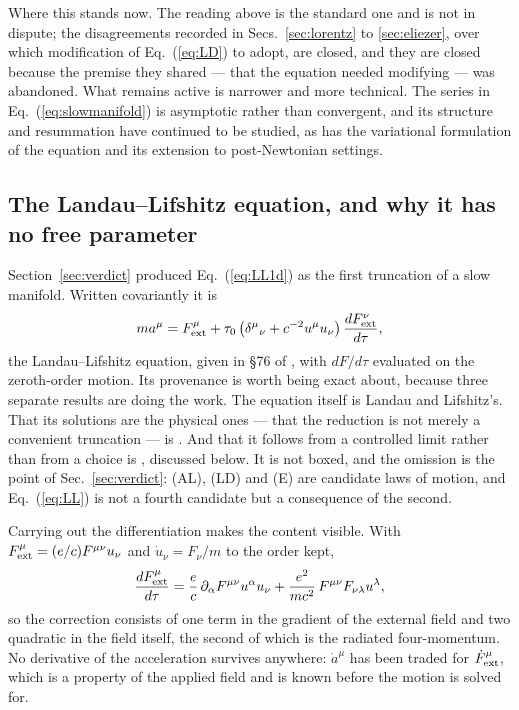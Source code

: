 \documentclass[preprint]{aastex701}
\newcommand{\taunought}{\tau_0}
\begin{document}
Where this stands now. The reading above is the standard one and is not in
dispute; the disagreements recorded in Secs.~\ref{sec:lorentz} to
\ref{sec:eliezer}, over which modification of Eq.~(\ref{eq:LD}) to adopt, are
closed, and they are closed because the premise they shared --- that the
equation needed modifying --- was abandoned. What remains active is narrower and
more technical. The series in Eq.~(\ref{eq:slowmanifold}) is asymptotic rather
than convergent, and its structure and resummation have continued to be studied,
as has the variational formulation of the equation and its extension to
post-Newtonian settings.%
{}

\subsection{The Landau--Lifshitz equation, and why it has no free parameter}
\label{sec:LLeq}

Section~\ref{sec:verdict} produced Eq.~(\ref{eq:LL1d}) as the first truncation
of a slow manifold. Written covariantly it is
\begin{equation}
ma^\mu = F^\mu_{\rm ext}
+ \taunought\left(\delta^\mu{}_\nu + c^{-2}u^\mu u_\nu\right)
\frac{dF^\nu_{\rm ext}}{d\tau},
\label{eq:LL}
\end{equation}
the Landau--Lifshitz equation, given in \S76 of \citet{landau_lifshitz}, with
$dF/d\tau$ evaluated on the zeroth-order motion. Its provenance is worth being
exact about, because three separate results are doing the work. The equation
itself is Landau and Lifshitz's. That its solutions are the physical ones ---
that the reduction is not merely a convenient truncation --- is
\citet{spohn2000}. And that it follows from a controlled limit rather than from
a choice is \citet{gralla2009}, discussed below. It is not boxed, and the omission is the
point of Sec.~\ref{sec:verdict}: (AL), (LD) and (E) are candidate laws of
motion, and Eq.~(\ref{eq:LL}) is not a fourth candidate but a consequence of the
second.

Carrying out the differentiation makes the content visible. With
$F^\mu_{\rm ext} = (e/c)F^{\mu\nu}u_\nu$ and $\dot u_\nu = F_\nu/m$ to the order
kept,
\begin{equation}
\frac{dF^\mu_{\rm ext}}{d\tau}
= \frac{e}{c}\,\partial_\alpha F^{\mu\nu}u^\alpha u_\nu
+ \frac{e^2}{mc^2}\,F^{\mu\nu}F_{\nu\lambda}u^\lambda ,
\label{eq:Fdot}
\end{equation}
so the correction consists of one term in the gradient of the external field and
two quadratic in the field itself, the second of which is the radiated
four-momentum. No derivative of the acceleration survives anywhere:
$\dot a^\mu$ has been traded for $\dot F^\mu_{\rm ext}$, which is a property of
the applied field and is known before the motion is solved for.
\end{document}
